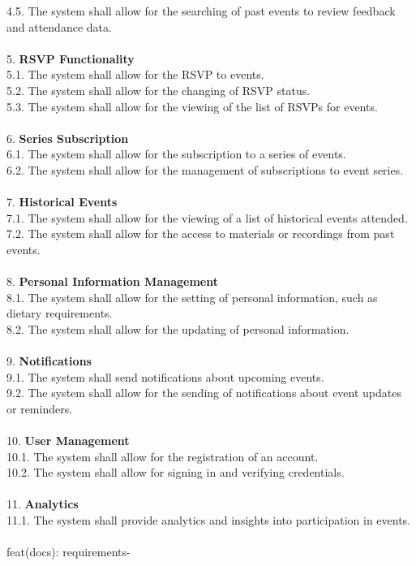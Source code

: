 \documentclass[a4paper,12pt]{article}
\begin{document}
    4.5. The system shall allow for the searching of past events to review feedback and attendance data.\\\\
5. \textbf{RSVP Functionality}\\
    5.1. The system shall allow for the RSVP to events.\\
    5.2. The system shall allow for the changing of RSVP status.\\
    5.3. The system shall allow for the viewing of the list of RSVPs for events.\\\\
6. \textbf{Series Subscription}\\
    6.1. The system shall allow for the subscription to a series of events.\\
    6.2. The system shall allow for the management of subscriptions to event series.\\\\
7. \textbf{Historical Events}\\
    7.1. The system shall allow for the viewing of a list of historical events attended.\\
    7.2. The system shall allow for the access to materials or recordings from past events.\\\\
8. \textbf{Personal Information Management}\\
    8.1. The system shall allow for the setting of personal information, such as dietary requirements.\\
    8.2. The system shall allow for the updating of personal information.\\\\
9. \textbf{Notifications}\\
    9.1. The system shall send notifications about upcoming events.\\
    9.2. The system shall allow for the sending of notifications about event updates or reminders.\\\\
10. \textbf{User Management}\\
    10.1. The system shall allow for the registration of an account.\\
    10.2. The system shall allow for signing in and verifying credentials.\\\\
11. \textbf{Analytics}\\
    11.1. The system shall provide analytics and insights into participation in events.\\\\
    feat(docs): requirements-
\end{document}

